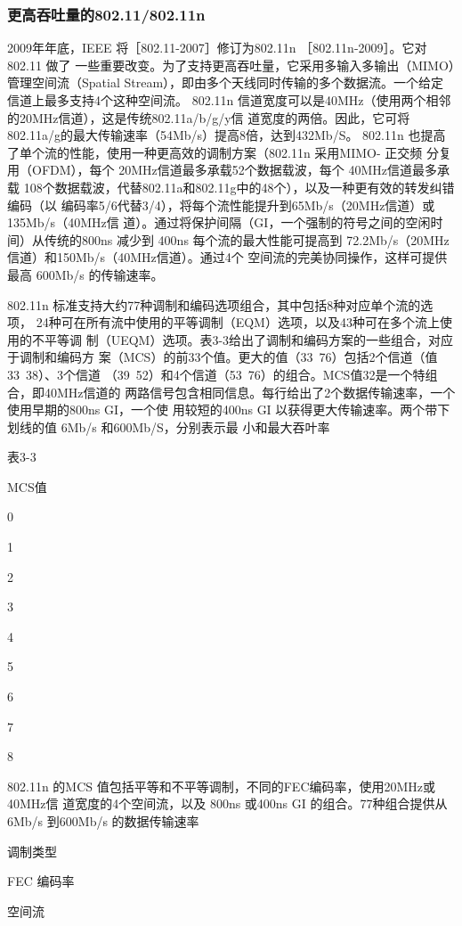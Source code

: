 \subsubsection{更高吞吐量的802.11/802.11n}

2009年年底，IEEE 将［802.11-2007］修订为802.11n ［802.11n-2009］。它对802.11 做了
一些重要改变。为了支持更高吞吐量，它采用多输入多输出（MIMO）管理空间流（Spatial
Stream），即由多个天线同时传输的多个数据流。一个给定信道上最多支持4个这种空间流。
802.11n 信道宽度可以是40MHz（使用两个相邻的20MHz信道），这是传统802.11a/b/g/y信
道宽度的两倍。因此，它可将 802.11a/g的最大传输速率（54Mb/s）提高8倍，达到432Mb/S。
802.11n 也提高了单个流的性能，使用一种更高效的调制方案（802.11n 采用MIMO- 正交频
分复用（OFDM），每个 20MHz信道最多承载52个数据载波，每个 40MHz信道最多承载
108个数据载波，代替802.11a和802.11g中的48个），以及一种更有效的转发纠错编码（以
编码率5/6代替3/4），将每个流性能提升到65Mb/s（20MHz信道）或135Mb/s（40MHz信
道）。通过将保护间隔（GI，一个强制的符号之间的空闲时间）从传统的800ns 减少到 400ns
每个流的最大性能可提高到 72.2Mb/s（20MHz信道）和150Mb/s（40MHz信道）。通过4个
空间流的完美协同操作，这样可提供最高 600Mb/s 的传输速率。

802.11n 标准支持大约77种调制和编码选项组合，其中包括8种对应单个流的选项，
24种可在所有流中使用的平等调制（EQM）选项，以及43种可在多个流上使用的不平等调
制（UEQM）选项。表3-3给出了调制和编码方案的一些组合，对应于调制和编码方
案（MCS）的前33个值。更大的值（33~76）包括2个信道（值33~38）、3个信道
（39~52）和4个信道（53~76）的组合。MCS值32是一个特组合，即40MHz信道的
两路信号包含相同信息。每行给出了2个数据传输速率，一个使用早期的800ns GI，一个使
用较短的400ns GI 以获得更大传输速率。两个带下划线的值 6Mb/s 和600Mb/S，分别表示最
小和最大吞叶率

表3-3

MCS值

0

1

2

3

4

5

6

7

8

802.11n 的MCS 值包括平等和不平等调制，不同的FEC编码率，使用20MHz或40MHz信
道宽度的4个空间流，以及 800ns 或400ns GI 的组合。77种组合提供从6Mb/s 到600Mb/s
的数据传输速率

调制类型

FEC 编码率

空间流

